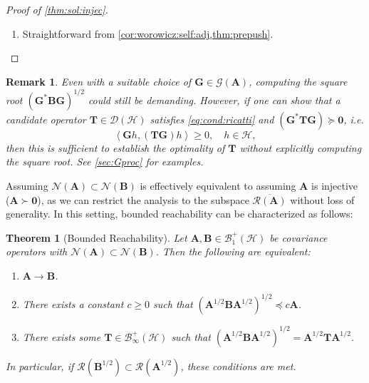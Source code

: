 \documentclass[noinfoline]{imsart}\setcounter{tocdepth}{2}
\newcommand{\m}[1]{\mathbf{#1}} %
\renewcommand{\c}[1]{\mathcal{#1}} %
\newcommand{\innpr}[2]{{\left\langle {#1},{#2}\right\rangle}} %
\theoremstyle{plain}
\newtheorem{theorem}{Theorem}[section]
\newtheorem{remark}{Remark}[section]
\begin{document}
\begin{proof}[Proof of \cref{thm:sol:injec}]
\begin{enumerate}[leftmargin = *]
\item Straightforward from \cref{cor:worowicz:self:adj,thm:prepush}.
\end{enumerate}
\end{proof}


\begin{remark}\label{rmk:spd:then:opt}
Even with a suitable choice of $\m{G} \in \c{G}(\m{A})$, computing the square root $(\m{G}^{*} \m{B} \m{G})^{1/2}$ could still be demanding. However, if one can show that a candidate operator $\m{T} \in \c{D}(\c{H})$ satisfies \eqref{eq:cond:ricatti} and $(\m{G}^{*} \m{T} \m{G}) \succeq \m{0}$, i.e.
\begin{equation*}
    \innpr{\m{G} h}{(\m{T} \m{G}) h} \ge 0, \quad h \in \c{H},
\end{equation*}
then this is sufficient to establish the optimality of $\m{T}$ without explicitly computing the square root. See \cref{sec:Gproc} for examples.
\end{remark}

Assuming $\c{N}(\m{A}) \subset \c{N}(\m{B})$ is effectively equivalent to assuming $\m{A}$ is injective ($\m{A} \succ \m{0}$), as we can restrict the analysis to the subspace $\overline{\c{R}(\m{A})}$ without loss of generality. In this setting, bounded reachability can be characterized as follows:

\begin{theorem}[Bounded Reachability]\label{thm:bdd:reach}
Let $\m{A}, \m{B} \in \c{B}_{1}^{+}(\c{H})$ be covariance operators with $\c{N}(\m{A}) \subset \c{N}(\m{B})$. Then the following are equivalent:
\begin{enumerate}[leftmargin = *]
    \item $\m{A} \to \m{B}$.
    \item There exists a constant $c \ge 0$ such that $(\m{A}^{1/2} \m{B} \m{A}^{1/2})^{1/2} \preceq c \m{A}$.
    \item There exists some $\m{T} \in \c{B}_{\infty}^{+}(\c{H})$ such that $(\m{A}^{1/2} \m{B} \m{A}^{1/2})^{1/2} = \m{A}^{1/2} \m{T} \m{A}^{1/2}$.
\end{enumerate}
In particular, if $\c{R}(\m{B}^{1/2}) \subset \c{R}(\m{A}^{1/2})$, these conditions are met.
\end{theorem}
\end{document}
